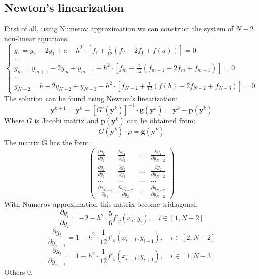 \documentclass[12pt, letterpaper]{article}
\begin{document}
	\subsection{Newton's linearization}
	First of all, using Numerov approximation we can construct the system of $N-2$ non-linear equations.
	\begin{equation}\label{ODY}
	\begin{cases}
	g_1 = y_2 - 2 y_1 + a - h^2 \cdot [f_1 + \frac{1}{12}(f_2 - 2f_1 + f(a))] = 0	 \\
	\dots \\
	g_m = y_{m+1} - 2 y_m + y_{m-1} - h^2 \cdot [f_m + \frac{1}{12}(f_{m+1} - 2f_m + f_{m-1})] = 0\\
	\dots \\
	g_{N-2} = b - 2 y_{N-2} + y_{N-3} - h^2 \cdot [f_{N-2} + \frac{1}{12}(f(b) - 2f_{N-2} + f_{N-3})] = 0
	\end{cases}	
	\end{equation}
	The solution can be found using Newton's linearization:
	\begin{equation}
	\textbf{y}^{k+1} = \textbf{y}^k - [G'(\textbf{y}^{k})]^{-1} \cdot \textbf{g}(\textbf{y}^{k}) = \textbf{y}^k - \textbf{p}(\textbf{y}^k) 
	\end{equation}
	Where $G$ is Jacobi matrix and $\textbf{p}(\textbf{y}^k)$ can be obtained from:
	\begin{equation}
		G(\textbf{y}^k)\cdot p = \textbf{g}(\textbf{y}^k) 
	\end{equation}
	The matrix G has the form:
	\begin{equation}
	\begin{pmatrix}
	\frac{\partial g_1}{\partial y_1}& \frac{\partial g_1}{\partial y_2}& \dots & \frac{\partial g_1}{\partial y_{N-2}}\\
	\frac{\partial g_2}{\partial y_1}& \frac{\partial g_2}{\partial y_2}& \dots & \frac{\partial g_2}{\partial y_{N-2}}\\
	\dots & \dots & \dots & \dots\\
\frac{\partial g_{N-2}}{\partial y_1}& \frac{\partial g_{N-2}}{\partial y_2}& \dots& 				\frac{\partial g_{N-2}}{\partial y_{N-2}}
	\end{pmatrix}
	\end{equation}
	With Numerov approximation this matrix become tridiagonal.
	\begin{equation}
	\frac{\partial g_i}{\partial y_i} = -2 - h^2 \cdot \frac{5}{6}f'_y(x_i, y_i)
	, \quad i \in [1, N-2]	
	\end{equation}
	\begin{equation}
	\frac{\partial g_{i}}{\partial y_{i-1}} = 1 - h^2 \cdot \frac{1}{12}f'_y(x_{i-1}, y_{i-1})	, \quad i \in [2, N-2]
	\end{equation}
	\begin{equation}
	\frac{\partial g_{i}}{\partial y_{i+1}} = 1 - h^2 \cdot \frac{1}{12}f'_y(x_{i+1}, y_{i+1}), \quad i \in [1, N-3]
	\end{equation}
	Others 0.
\end{document}

